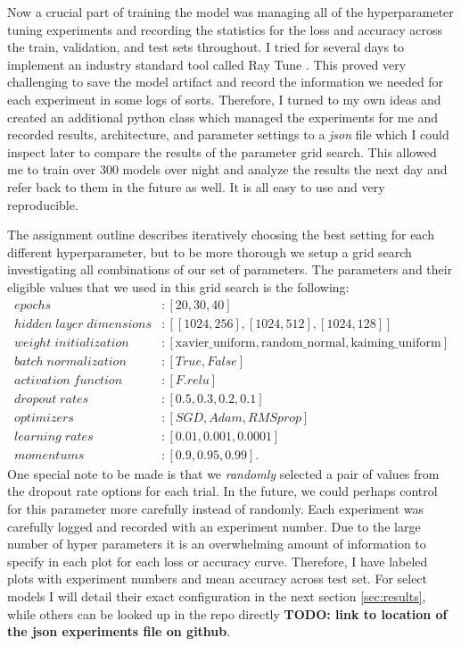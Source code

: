 \documentclass[10pt]{amsart}
\begin{document}
Now a crucial part of training the model was managing all of the hyperparameter tuning experiments and recording the statistics for the loss and accuracy across the train, validation, and test sets throughout.
I tried for several days to implement an industry standard tool called Ray Tune \cite{liaw2018tune}.
This proved very challenging to save the model artifact and record the information we needed for each experiment in some logs of sorts.
Therefore, I turned to my own ideas and created an additional python class which managed the experiments for me and recorded results, architecture, and parameter settings to a \textit{json} file which I could inspect later to compare the results of the parameter grid search.
This allowed me to train over 300 models over night and analyze the results the next day and refer back to them in the future as well.
It is all easy to use and very reproducible.

The assignment outline describes iteratively choosing the best setting for each different hyperparameter, but to be more thorough we setup a grid search investigating all combinations of our set of parameters.
The parameters and their eligible values that we used in this grid search is the following:
\begin{align*}
epochs &: [20, 30, 40] \\
hidden \; layer \; dimensions &: [[1024, 256], [1024, 512], [1024, 128]] \\
weight \; initialization &: [\text{xavier\_uniform}, \text{random\_normal}, \text{kaiming\_uniform}] \\
batch \; normalization &: [True, False] \\
activation \; function &: [F.relu] \\
dropout \; rates &: [0.5, 0.3, 0.2, 0.1] \\
optimizers &: [SGD, Adam, RMSprop] \\
learning \; rates &: [0.01, 0.001, 0.0001] \\
momentums &: [0.9, 0.95, 0.99].
\end{align*}
One special note to be made is that we \textit{randomly} selected a pair of values from the dropout rate options for each trial.
In the future, we could perhaps control for this parameter more carefully instead of randomly.
Each experiment was carefully logged and recorded with an experiment number.
Due to the large number of hyper parameters it is an overwhelming amount of information to specify in each plot for each loss or accuracy curve.
Therefore, I have labeled plots with experiment numbers and mean accuracy across test set.
For select models I will detail their exact configuration in the next section \ref{sec:results}, while others can be looked up in the repo directly \textbf{TODO: link to location of the json experiments file on github}.
\end{document}
